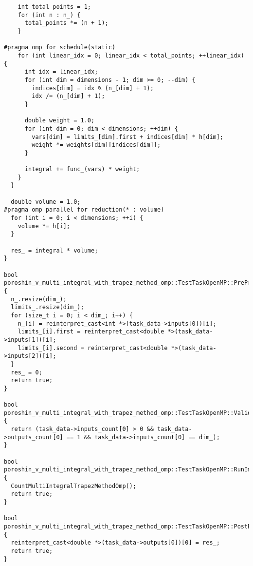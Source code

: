 \documentclass[12pt]{article}
\begin{document}
\begin{lstlisting}
    int total_points = 1;
    for (int n : n_) {
      total_points *= (n + 1);
    }

#pragma omp for schedule(static)
    for (int linear_idx = 0; linear_idx < total_points; ++linear_idx) {
      int idx = linear_idx;
      for (int dim = dimensions - 1; dim >= 0; --dim) {
        indices[dim] = idx % (n_[dim] + 1);
        idx /= (n_[dim] + 1);
      }

      double weight = 1.0;
      for (int dim = 0; dim < dimensions; ++dim) {
        vars[dim] = limits_[dim].first + indices[dim] * h[dim];
        weight *= weights[dim][indices[dim]];
      }

      integral += func_(vars) * weight;
    }
  }

  double volume = 1.0;
#pragma omp parallel for reduction(* : volume)
  for (int i = 0; i < dimensions; ++i) {
    volume *= h[i];
  }

  res_ = integral * volume;
}

bool poroshin_v_multi_integral_with_trapez_method_omp::TestTaskOpenMP::PreProcessingImpl() {
  n_.resize(dim_);
  limits_.resize(dim_);
  for (size_t i = 0; i < dim_; i++) {
    n_[i] = reinterpret_cast<int *>(task_data->inputs[0])[i];
    limits_[i].first = reinterpret_cast<double *>(task_data->inputs[1])[i];
    limits_[i].second = reinterpret_cast<double *>(task_data->inputs[2])[i];
  }
  res_ = 0;
  return true;
}

bool poroshin_v_multi_integral_with_trapez_method_omp::TestTaskOpenMP::ValidationImpl() {
  return (task_data->inputs_count[0] > 0 && task_data->outputs_count[0] == 1 && task_data->inputs_count[0] == dim_);
}

bool poroshin_v_multi_integral_with_trapez_method_omp::TestTaskOpenMP::RunImpl() {
  CountMultiIntegralTrapezMethodOmp();
  return true;
}

bool poroshin_v_multi_integral_with_trapez_method_omp::TestTaskOpenMP::PostProcessingImpl() {
  reinterpret_cast<double *>(task_data->outputs[0])[0] = res_;
  return true;
}
\end{lstlisting}
\end{document}
